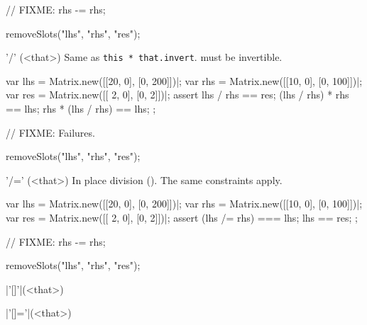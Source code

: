 \begin{urbiscriptapi}
\begin{urbiscript}
// FIXME: rhs -= rhs;
\end{urbiscript}
\begin{urbicomment}
  removeSlots("lhs", "rhs", "res");
\end{urbicomment}

\item['/'](<that>)%
  Same as \lstinline|this * that.invert|.  \that must be invertible.
\begin{urbiscript}
var lhs = Matrix.new([[20, 0], [0, 200]])|;
var rhs = Matrix.new([[10, 0], [0, 100]])|;
var res = Matrix.new([[ 2, 0], [0,   2]])|;
assert
{
  lhs / rhs == res;
  (lhs / rhs) * rhs == lhs;
  rhs * (lhs / rhs) == lhs;
};

// FIXME: Failures.
\end{urbiscript}
\begin{urbicomment}
  removeSlots("lhs", "rhs", "res");
\end{urbicomment}

\item['/='](<that>)%
  In place division ().  The same constraints apply.
\begin{urbiscript}
var lhs = Matrix.new([[20, 0], [0, 200]])|;
var rhs = Matrix.new([[10, 0], [0, 100]])|;
var res = Matrix.new([[ 2, 0], [0,   2]])|;
assert
{
  (lhs /= rhs) === lhs;
  lhs == res;
};

// FIXME: rhs -= rhs;
\end{urbiscript}
\begin{urbicomment}
  removeSlots("lhs", "rhs", "res");
\end{urbicomment}


\item|'[]'|(<that>)%
\begin{urbiassert}

\end{urbiassert}

\item|'[]='|(<that>)%
\begin{urbiassert}

\end{urbiassert}
\end{urbiscriptapi}

